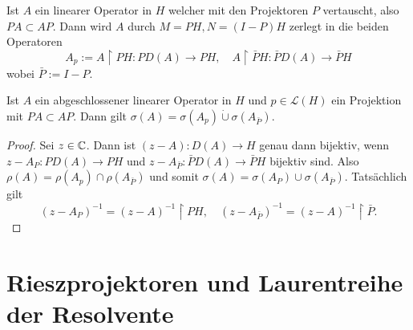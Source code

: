 \documentclass{mycourse}
\begin{document}
Ist $A$ ein linearer Operator in $H$ welcher mit den Projektoren $P$ vertauscht, also $PA\subset AP$. Dann wird $A$ durch $M=PH, N=(I-P)H$ zerlegt in die beiden Operatoren
\[
A_p:=A \upharpoonright PH: PD(A) \to PH, \quad A \upharpoonright \bar PH: \bar P D(A) \to \bar{P}H
\] 
wobei $\bar P:=I-P$.
\begin{lem}\label{1.4}
Ist $A$ ein abgeschlossener linearer Operator in $H$ und $p\in \mathcal L(H)$ ein Projektion mit $PA \subset AP$. Dann gilt $\sigma(A)=\sigma(A_p)\dot\cup \sigma(A_{\bar{P}})$.
\end{lem}
\begin{proof}
Sei $z\in \mathbb{C}$. Dann ist $(z-A):D(A) \to H$ genau dann bijektiv, wenn $z-A_P: PD(A)\to PH$ und $z-A_{\bar{P}}:\bar P D(A) \to \bar P H$ bijektiv sind. Also $\rho(A)=\rho(A_p) \cap \rho(A_{\bar P})$ und somit $\sigma(A)=\sigma(A_P) \cup \sigma(A_{\bar P})$. Tatsächlich gilt
\[
(z-A_P)^{-1}=(z-A)^{-1} \upharpoonright PH, \quad (z-A_{\bar P})^{-1} = (z-A)^{-1} \upharpoonright \bar P.
\]
\end{proof}
\section{Rieszprojektoren und Laurentreihe der Resolvente}
\end{document}
